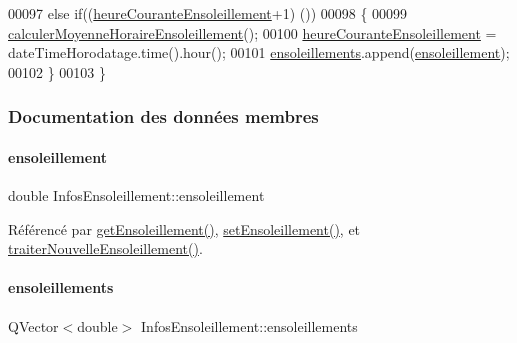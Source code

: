 \begin{DoxyCode}
00097     \textcolor{keywordflow}{else} \textcolor{keywordflow}{if}((\hyperlink{class_infos_ensoleillement_adbf40d147f8a7dbcf5f71b1ac4e0933d}{heureCouranteEnsoleillement}+1)%
      ())
00098     \{
00099         \hyperlink{class_infos_ensoleillement_a43d0967a59887bf70071296fef0660d3}{calculerMoyenneHoraireEnsoleillement}();
00100         \hyperlink{class_infos_ensoleillement_adbf40d147f8a7dbcf5f71b1ac4e0933d}{heureCouranteEnsoleillement} = dateTimeHorodatage.time().hour();
00101         \hyperlink{class_infos_ensoleillement_a6c3640ed7f3169e6263dc04b0191f478}{ensoleillements}.append(\hyperlink{class_infos_ensoleillement_a5f3ad64743e3beeb4e64c4555ec6155c}{ensoleillement});
00102     \}
00103 \}
\end{DoxyCode}


\subsubsection{Documentation des données membres}
\mbox{\label{class_infos_ensoleillement_a5f3ad64743e3beeb4e64c4555ec6155c}} 
\paragraph{\texorpdfstring{ensoleillement}{ensoleillement}}
{\footnotesize\ttfamily double Infos\+Ensoleillement\+::ensoleillement\hspace{0.3cm}{\ttfamily [private]}}



Référencé par \hyperlink{class_infos_ensoleillement_a388dd7b2ae97839a779ca1384ca8e6e2}{get\+Ensoleillement()}, \hyperlink{class_infos_ensoleillement_a27c6d3d6e063e2f09fbe23a04cd89dfc}{set\+Ensoleillement()}, et \hyperlink{class_infos_ensoleillement_abe5426845614e3383e915dc9b3cacc3e}{traiter\+Nouvelle\+Ensoleillement()}.

\mbox{\label{class_infos_ensoleillement_a6c3640ed7f3169e6263dc04b0191f478}} 
\paragraph{\texorpdfstring{ensoleillements}{ensoleillements}}
{\footnotesize\ttfamily Q\+Vector$<$double$>$ Infos\+Ensoleillement\+::ensoleillements\hspace{0.3cm}{\ttfamily [private]}}



